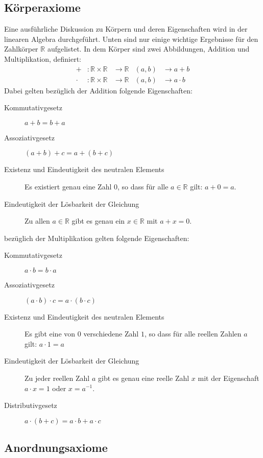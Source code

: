 \documentclass[ngerman,titlepage,twoside, parskip=half*]{scrreprt}
\newcommand*{\R}{\mathbb{R}}
\theoremstyle{break}
\theoremstyle{nonumberbreak}
\begin{document}
\subsection{Körperaxiome}

Eine ausführliche Diskussion zu Körpern und deren Eigenschaften wird
in der linearen Algebra durchgeführt. Unten sind nur einige wichtige
Ergebnisse für den Zahlkörper $\R$ aufgelistet. In dem Körper sind zwei
Abbildungen, Addition und Multiplikation, definiert:
\begin{align*}
  +&\colon\R\times\R&\rightarrow\R& (a,b)&\rightarrow a+b\\
  \cdot&\colon\R\times\R&\rightarrow\R& (a,b)&\rightarrow a\cdot b
\end{align*}
Dabei gelten bezüglich der Addition folgende Eigenschaften:
\begin{description}
 \item[Kommutativgesetz] $a+b=b+a$
 \item[Assoziativgesetz] $(a+b)+c=a+(b+c)$
 \item[Existenz und Eindeutigkeit des neutralen Elements] Es existiert genau
  eine Zahl $0$, so dass für alle $a\in\R$ gilt: $a+0=a$.
 \item[Eindeutigkeit der Lösbarkeit der Gleichung] Zu allen $a\in\R$ gibt es
  genau ein $x\in \R$ mit $a+x=0$.
\end{description}
bezüglich der Multiplikation gelten folgende Eigenschaften:
\begin{description}
\item[Kommutativgesetz] $a \cdot b = b \cdot a$
\item[Assoziativgesetz] $(a \cdot b) \cdot c = a \cdot (b\cdot c)$
\item[Existenz und Eindeutigkeit des neutralen Elements] Es gibt eine
  von $0$ verschiedene Zahl $1$, so dass für alle reellen Zahlen $a$
  gilt: $a \cdot 1 = a$
\item[Eindeutigkeit der Lösbarkeit der Gleichung] Zu jeder reellen
  Zahl $a$ gibt es genau eine reelle Zahl $x$ mit der Eigenschaft $a
  \cdot x = 1$ oder $x = a^{-1}$.
\item[Distributivgesetz] $a \cdot (b+c) = a \cdot b + a \cdot c$
\end{description}

\subsection{Anordnungsaxiome}
\end{document}
